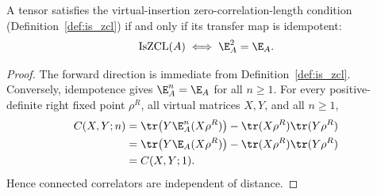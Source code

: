 \begin{theorem}%
    \label{thm:zcl_iff_idempotent_transfer}
    \leanok
    A tensor satisfies the virtual-insertion zero-correlation-length condition
    (Definition~\ref{def:is_zcl}) if and only if its transfer map is
    idempotent:
    \begin{align}
        \text{IsZCL}(A) \iff \E_A^2 = \E_A.
        \notag
    \end{align}
\end{theorem}
\begin{proof}\leanok
    The forward direction is immediate from Definition~\ref{def:is_zcl}.
    Conversely, idempotence gives $\E_A^n=\E_A$ for all $n\ge1$. For every
    positive-definite right fixed point $\rho^R$, all virtual matrices $X,Y$,
    and all $n\ge1$,
    \begin{align}
        C(X,Y;n)
         & =\tr\!\left(Y\E_A^n(X\rho^R)\right)
        -\tr(X\rho^R)\tr(Y\rho^R)
        \notag                                 \\
         & =\tr\!\left(Y\E_A(X\rho^R)\right)
        -\tr(X\rho^R)\tr(Y\rho^R)
        \notag                                 \\
         & =C(X,Y;1).
        \notag
    \end{align}
    Hence connected correlators are independent of distance.
\end{proof}
